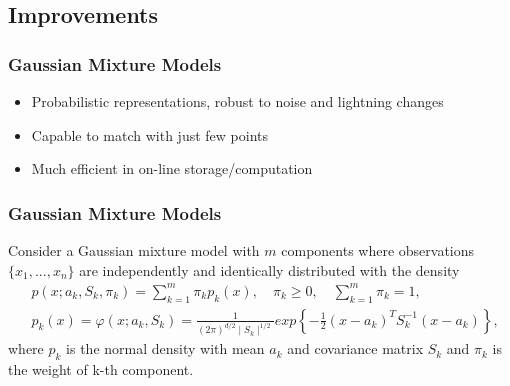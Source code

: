 \documentclass{beamer}
\begin{document}
\subsection{Improvements}

\begin{frame}
\frametitle{Gaussian Mixture Models}
\begin{itemize}
\item Probabilistic representations, robust to noise and lightning changes
\item Capable to match with just few points
\item Much efficient in on-line storage/computation 
\end{itemize}
\end{frame}

\begin{frame}
\frametitle{Gaussian Mixture Models}
Consider a Gaussian mixture model with $m$ components where observations $\{x_1,...,x_n\}$ are independently and identically distributed with the density
\begin{equation}
\begin{split}
& p(x;a_k,S_k, \pi _k) =  \sum _{k=1}^{m} \pi _kp_k(x),  \quad \pi _k  \geq 0,  \quad \sum _{k=1}^{m} \pi _k=1,\\
& p_k(x)= \varphi (x;a_k,S_k)= \frac{1}{(2\pi)^{d/2}\mid{S_k}\mid^{1/2}} exp \left \{ - \frac{1}{2} (x-a_k)^TS_k^{-1}(x-a_k) \right \} ,
\end{split}
\end{equation}
where $p_k$ is the normal density with mean $a_k$ and covariance matrix $S_k$ and $\pi_k$ is the weight of k-th component.
\end{frame}
\end{document}
